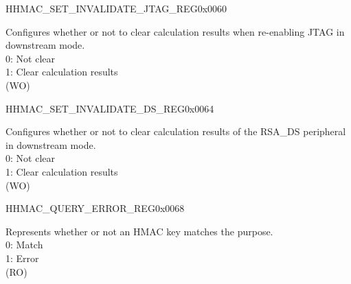 \begin{register}{H}{HMAC\_SET\_INVALIDATE\_JTAG\_REG}{0x0060}\label{regdesc:HMACSETINVALIDATEJTAGREG}
%
%
\regnewline%
\begin{regdesc}\begin{reglist}
\label{fielddesc:HMACSETINVALIDATEJTAG}\item [HMAC\_SET\_INVALIDATE\_JTAG] Configures whether or not to clear calculation results when re-enabling JTAG in downstream mode.
\\0: Not clear
\\1: Clear calculation results
\\(WO)
\end{reglist}\end{regdesc}
\end{register}


\begin{register}{H}{HMAC\_SET\_INVALIDATE\_DS\_REG}{0x0064}\label{regdesc:HMACSETINVALIDATEDSREG}
%
%
\regnewline%
\begin{regdesc}\begin{reglist}
\label{fielddesc:HMACSETINVALIDATEDS}\item [HMAC\_SET\_INVALIDATE\_DS] Configures whether or not to clear calculation results of the RSA\_DS peripheral in downstream mode.
\\0: Not clear
\\1: Clear calculation results
\\(WO)
\end{reglist}\end{regdesc}
\end{register}


\begin{register}{H}{HMAC\_QUERY\_ERROR\_REG}{0x0068}\label{regdesc:HMACQUERYERRORREG}
%
%
\regnewline%
\begin{regdesc}\begin{reglist}
\label{fielddesc:HMACQUREYCHECK}\item [HMAC\_QUREY\_CHECK] Represents whether or not an HMAC key matches the purpose.
\\0: Match
\\1: Error
\\(RO)
\end{reglist}\end{regdesc}
\end{register}


